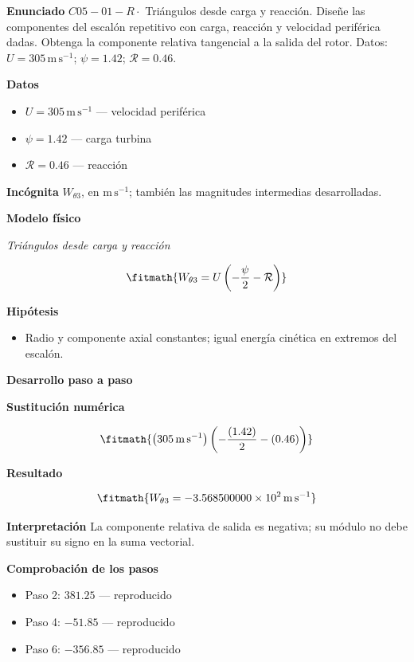\documentclass[10pt,openany]{book}
\begin{document}
\begin{tcolorbox}[title={Problema resuelto 1}, studiumworked, breakable]

\noindent\textbf{Enunciado}
\(C05-01-R \cdot\) Triángulos desde carga y reacción. Diseñe las componentes del escalón repetitivo con carga, reacción y velocidad periférica dadas. Obtenga la componente relativa tangencial a la salida del rotor. Datos: \(U=305\, \mathrm{m}\,\mathrm{s}^{-1}\); \(\psi=1.42\); \(\mathcal R=0.46\).

\noindent\textbf{Datos}
\begin{itemize}
\item $U = 305\,\mathrm{m}\,\mathrm{s}^{-1}$ — velocidad periférica
\item $\psi = 1.42$ — carga turbina
\item $\mathcal R = 0.46$ — reacción
\end{itemize}

\noindent\textbf{Incógnita}
$W_{\theta 3}$, en $\mathrm{m\,s^{-1}}$; también las magnitudes intermedias desarrolladas.

\noindent\textbf{Modelo físico}

\noindent\textit{Triángulos desde carga y reacción}

\[
\fitmath{W_{\theta 3}=U \left(- \frac{\psi}{2} - \mathcal R\right)}
\]

\noindent\textbf{Hipótesis}
\begin{itemize}
\item Radio y componente axial constantes; igual energía cinética en extremos del escalón.
\end{itemize}

\noindent\textbf{Desarrollo paso a paso}



\noindent\textbf{Sustitución numérica}

\[
\fitmath{\left(305\,\mathrm{m}\,\mathrm{s}^{-1}\right) \left(- \frac{\left(1.42\right)}{2} - \left(0.46\right)\right)}
\]

\noindent\textbf{Resultado}

\[
\fitmath{W_{\theta 3}=-3.568500000\times10^{2}\,\mathrm{m}\,\mathrm{s}^{-1}}
\]

\noindent\textbf{Interpretación}
La componente relativa de salida es negativa; su módulo no debe sustituir su signo en la suma vectorial.

\noindent\textbf{Comprobación de los pasos}
\begin{itemize}
\item Paso 2: $381.25$ — reproducido
\item Paso 4: $-51.85$ — reproducido
\item Paso 6: $-356.85$ — reproducido
\end{itemize}


\end{tcolorbox}
\end{document}
